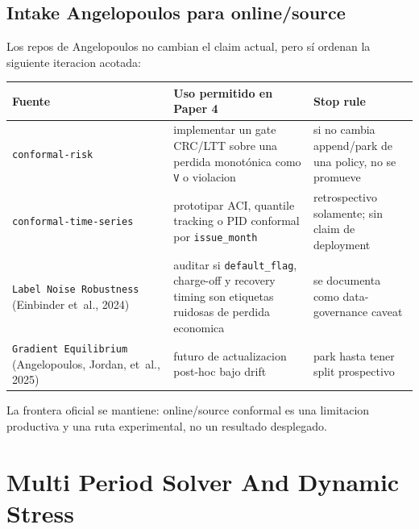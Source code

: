 \documentclass[
  spanish,
  11pt,
  letterpaper,
]{scrbook}
\newcounter{none} %
\theoremstyle{plain}
\theoremstyle{remark}
\begin{document}
\section{Intake Angelopoulos para
online/source}\label{intake-angelopoulos-para-onlinesource}

Los repos de Angelopoulos no cambian el claim actual, pero sí ordenan la
siguiente iteracion acotada:

{\def\LTcaptype{none} %
\begin{longtable}[]{@{}
  >{\raggedright\arraybackslash}p{}
  >{\raggedright\arraybackslash}p{}
  >{\raggedright\arraybackslash}p{}@{}}
\toprule\noalign{}
\begin{minipage}[b]{\linewidth}\raggedright
Fuente
\end{minipage} & \begin{minipage}[b]{\linewidth}\raggedright
Uso permitido en Paper 4
\end{minipage} & \begin{minipage}[b]{\linewidth}\raggedright
Stop rule
\end{minipage} \\
\midrule\noalign{}
\endhead
\bottomrule\noalign{}
\endlastfoot
\texttt{conformal-risk} & implementar un gate CRC/LTT sobre una perdida
monotónica como \texttt{V} o violacion & si no cambia append/park de una
policy, no se promueve \\
\texttt{conformal-time-series} & prototipar ACI, quantile tracking o PID
conformal por \texttt{issue\_month} & retrospectivo solamente; sin claim
de deployment \\
\texttt{Label\ Noise\ Robustness} (Einbinder et~al., 2024) & auditar si
\texttt{default\_flag}, charge-off y recovery timing son etiquetas
ruidosas de perdida economica & se documenta como data-governance
caveat \\
\texttt{Gradient\ Equilibrium} (Angelopoulos, Jordan, et~al., 2025) &
futuro de actualizacion post-hoc bajo drift & park hasta tener split
prospectivo \\
\end{longtable}
}

La frontera oficial se mantiene: online/source conformal es una
limitacion productiva y una ruta experimental, no un resultado
desplegado.

\chapter{Multi Period Solver And Dynamic
Stress}\label{multi-period-solver-and-dynamic-stress}
\end{document}
